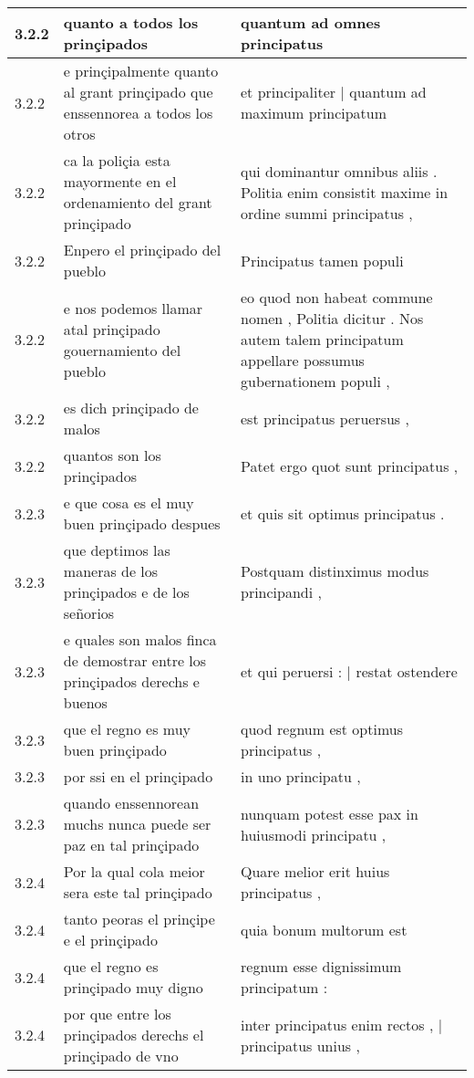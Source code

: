 \begin{tabular}{|p{1cm}|p{6.5cm}|p{6.5cm}|}
3.2.2 & quanto a todos los prinçipados & quantum ad omnes principatus \\\hline
3.2.2 & e prinçipalmente quanto al grant prinçipado que enssennorea a todos los otros & et principaliter | quantum ad maximum principatum \\\hline
3.2.2 & ca la poliçia esta mayormente en el ordenamiento del grant prinçipado & qui dominantur omnibus aliis . Politia enim consistit maxime in ordine summi principatus , \\\hline
3.2.2 & Enpero el prinçipado del pueblo & Principatus tamen populi \\\hline
3.2.2 & e nos podemos llamar atal prinçipado gouernamiento del pueblo & eo quod non habeat commune nomen , Politia dicitur . Nos autem talem principatum appellare possumus gubernationem populi , \\\hline
3.2.2 & es dich prinçipado de malos & est principatus peruersus , \\\hline
3.2.2 & quantos son los prinçipados & Patet ergo quot sunt principatus , \\\hline
3.2.3 & e que cosa es el muy buen prinçipado despues & et quis sit optimus principatus . \\\hline
3.2.3 & que deptimos las maneras de los prinçipados e de los señorios & Postquam distinximus modus principandi , \\\hline
3.2.3 & e quales son malos finca de demostrar entre los prinçipados derechs e buenos & et qui peruersi : | restat ostendere \\\hline
3.2.3 & que el regno es muy buen prinçipado & quod regnum est optimus principatus , \\\hline
3.2.3 & por ssi en el prinçipado & in uno principatu , \\\hline
3.2.3 & quando enssennorean muchs nunca puede ser paz en tal prinçipado & nunquam potest esse pax in huiusmodi principatu , \\\hline
3.2.4 & Por la qual cola meior sera este tal prinçipado & Quare melior erit huius principatus , \\\hline
3.2.4 & tanto peoras el prinçipe e el prinçipado & quia bonum multorum est \\\hline
3.2.4 & que el regno es prinçipado muy digno & regnum esse dignissimum principatum : \\\hline
3.2.4 & por que entre los prinçipados derechs el prinçipado de vno & inter principatus enim rectos , | principatus unius , \\\hline

\end{tabular}
